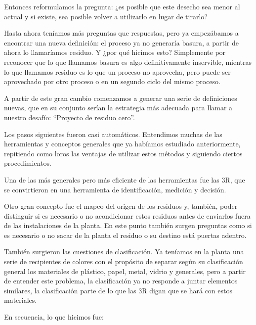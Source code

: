 \begin{fullwidth}
Entonces reformulamos la pregunta: ¿es posible que este desecho sea
menor al actual y si existe, sea posible volver a utilizarlo en lugar de
tirarlo?

Hasta ahora teníamos más preguntas que respuestas, pero ya empezábamos a
encontrar una nueva definición: el proceso ya no generaría basura, a
partir de ahora lo llamaríamos residuo. Y ¿por qué hicimos esto?
Simplemente por reconocer que lo que llamamos basura es algo
definitivamente inservible, mientras lo que llamamos residuo es lo que
un proceso no aprovecha, pero puede ser aprovechado por otro proceso o
en un segundo ciclo del mismo proceso.

A partir de este gran cambio comenzamos a generar una serie de
definiciones nuevas, que en su conjunto serían la estrategia más
adecuada para llamar a nuestro desafío: ``Proyecto de residuo cero''.

Los pasos siguientes fueron casi automáticos. Entendimos muchas de las
herramientas y conceptos generales que ya habíamos estudiado
anteriormente, repitiendo como loros las ventajas de utilizar estos
métodos y siguiendo ciertos procedimientos.

Una de las más generales pero más eficiente de las herramientas fue las
3R, que se convirtieron en una herramienta de identificación, medición y
decisión.

Otro gran concepto fue el mapeo del origen de los residuos y, también,
poder distinguir si es necesario o no acondicionar estos residuos antes
de enviarlos fuera de las instalaciones de la planta. En este punto
también surgen preguntas como si es necesario o no sacar de la planta el
residuo o su destino está puertas adentro.

También surgieron las cuestiones de clasificación. Ya teníamos en la
planta una serie de recipientes de colores con el propósito de separar
según su clasificación general los materiales de plástico, papel, metal,
vidrio y generales, pero a partir de entender este problema, la
clasificación ya no responde a juntar elementos similares, la
clasificación parte de lo que las 3R digan que se hará con estos
materiales.

En secuencia, lo que hicimos fue:


\end{fullwidth}
